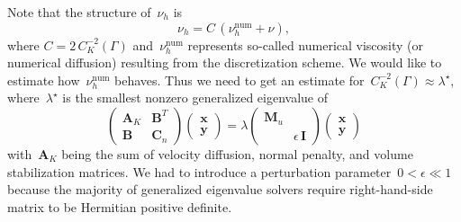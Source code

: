 \documentclass[12pt]{article}
\newcommand{\vect}[1]{\boldsymbol{\mathbf{#1}}}
\newcommand{\AZ}[1]{{\color{red}\textbf{AZ}:~#1}}
\begin{document}
Note that the structure of~$\nu_h$ is
\begin{equation}\label{num_visc}
	\nu_h = C\,(\nu_h^\text{num} + \nu),
\end{equation}
where $C = 2\,C_K^{-2}(\Gamma)$ and~$\nu_h^\text{num}$ represents so-called numerical viscosity (or numerical diffusion) resulting from the discretization scheme. We would like to estimate how~$\nu_h^\text{num}$ behaves. Thus we need to get an estimate for~$C_K^{-2}(\Gamma) \approx \lambda^\star$, where~$\lambda^\star$ is the smallest nonzero generalized eigenvalue of
\begin{equation}\label{kh_eig}
	\begin{pmatrix}
		\vect A_K & \vect B^T \\
		\vect B\phantom{_K} & \vect C_n
	\end{pmatrix}
	\begin{pmatrix} \vect x \\ \vect y \end{pmatrix} =
	\lambda
	\begin{pmatrix}
		\vect M_u & \\
		& \epsilon\,\vect I
	\end{pmatrix}
	\begin{pmatrix} \vect x \\ \vect y \end{pmatrix}
\end{equation}
with~$\vect A_K$ being the sum of velocity diffusion, normal penalty, and volume stabilization matrices. We had to introduce a perturbation parameter~$0 < \epsilon \ll 1$ because the majority of generalized eigenvalue solvers require right-hand-side matrix to be Hermitian positive definite.

\end{document}
